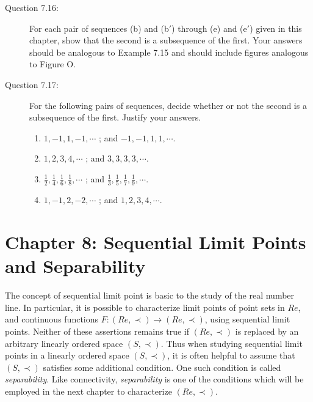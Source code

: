 \documentclass{book}
\begin{document}
\begin{description}
\item[Question 7.16:] For each pair of sequences (b) and (b$'$) through (e) and (e$'$) given in this chapter, show that the second is a subsequence of the first. Your answers should be analogous to Example 7.15 and should include figures analogous to Figure O.

\item[Question 7.17:] For the following pairs of sequences, decide whether or not the second is a subsequence of the first. Justify your answers.
\begin{enumerate}[\hspace{1cm}(a)]
  \item $1, -1, 1, -1, \cdots$ ; and $-1, -1, 1, 1, \cdots$.
  \item $1 , 2, 3, 4, \cdots$ ; and $3, 3, 3, 3, \cdots$.
  \item $\frac{1}{2}, \frac{1}{4}, \frac{1}{6}, \frac{1}{8}, \cdots$ ; and $\frac{1}{3}, \frac{1}{5}, \frac{1}{7}, \frac{1}{9}, \cdots$.
  \item $1, -1, 2, -2, \cdots$ ; and $1, 2, 3, 4, \cdots$.
\end{enumerate}


\end{description}




\chapter*{Chapter 8: Sequential Limit Points and Separability}


The concept of sequential limit point is basic to the study of the real number line. In particular, it is possible to characterize limit points of point sets in $Re$, and continuous functions $F: (Re, \prec) \rightarrow (Re, \prec)$, using sequential limit points. Neither of these assertions remains true if $(Re, \prec)$ is replaced by an arbitrary linearly ordered space $(S, \prec)$. Thus when studying sequential limit points in a linearly ordered space $(S, \prec)$, it is often helpful to assume that $(S, \prec)$ satisfies some additional condition. One such condition is called \emph{separability}. Like connectivity, \emph{separability} is one of the conditions which will be employed in the next chapter to characterize $(Re, \prec)$.
\end{document}
